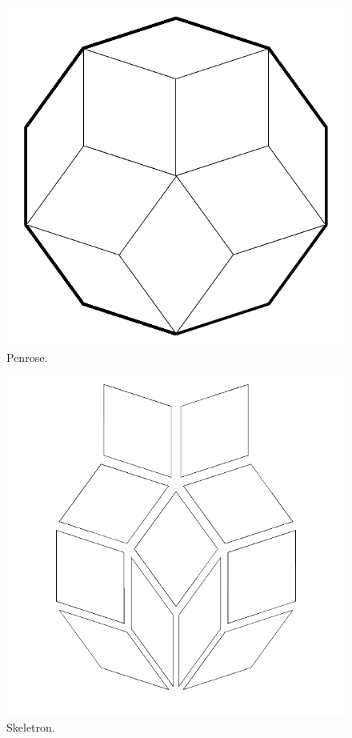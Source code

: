 \documentclass{report}
\begin{document}
\begin{figure}
	\centering
	\includegraphics[width=5in]{imageserver/uploadimages/image7.png}
	\caption{Penrose.}
\end{figure}

\begin{figure}
	\centering
	\includegraphics[width=5in]{imageserver/uploadimages/image8.png}
	\caption{Skeletron.}
\end{figure}
\end{document}
